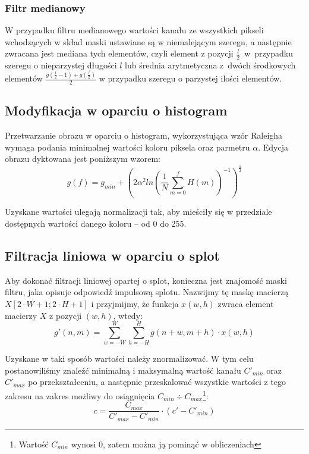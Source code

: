 \documentclass{classrep}
\begin{document}
\subsubsection{Filtr medianowy}
\label{filter.median}
W przypadku filtru medianowego wartości kanału ze wszystkich pikseli wchodzących w skład maski ustawiane są w niemalejącym szeregu, a następnie zwracana jest mediana tych elementów, czyli element z pozycji $\frac{l}{2}$~w~przypadku szeregu o nieparzystej długości $l$ lub średnia arytmetyczna z~dwóch środkowych elementów $\frac{g(\frac{l}{2} - 1) + g(\frac{l}{2})}{2}$ w przypadku szeregu o parzystej ilości elementów.

\subsection{Modyfikacja w oparciu o histogram}
Przetwarzanie obrazu w oparciu o histogram, wykorzystująca wzór Raleigha wymaga podania minimalnej wartości koloru piksela oraz parmetru $\alpha$. 
Edycja obrazu dyktowana jest poniższym wzorem:
\begin{equation}
g(f) = g_{min} + (2\alpha^{2}ln(\frac{1}{N} \displaystyle \sum \limits_{m=0}^{f} H(m))^{-1})^{\frac{1}{2}}
\end{equation}

Uzyskane wartości ulegają normalizacji tak, aby mieściły się w przedziale dostępnych wartości danego koloru – od 0 do 255.

\subsection{Filtracja liniowa w oparciu o splot}
\label{filter.convolution}
Aby dokonać filtracji liniowej opartej o splot, konieczna jest znajomość maski filtru, jaka opisuje odpowiedź impulsową splotu. Nazwijmy tę maskę macierzą $X[2 \cdot W + 1; 2 \cdot H + 1]$ i przyjmijmy, że funkcja $x(w, h)$ zwraca element macierzy $X$ z pozycji $(w, h)$, wtedy:
\begin{equation}
 g'(n, m) = \displaystyle \sum \limits_{w=-W}^W \displaystyle \sum \limits_{h=-H}^H g(n + w, m + h) \cdot x(w, h)
\end{equation}

Uzyskane w taki sposób wartości należy znormalizować. W tym celu postanowiliśmy znaleźć minimalną i maksymalną wartość kanału $C'_{min}$ oraz $C'_{max}$ po przekształceniu, a następnie przeskalować wszystkie wartości z tego zakresu na zakres możliwy do osiągnięcia $C_{min} \div C_{max}$\footnote{Wartość $C_{min}$ wynosi 0, zatem można ją pominąć w obliczeniach}:
\begin{equation}
 \label{eq:normalization}
 c = \frac{C_{max}}{C'_{max} - C'_{min}} \cdot (c' - C'_{min})
\end{equation}
\end{document}
